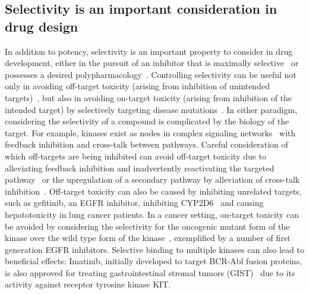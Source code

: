 \documentclass[phd,tocprelim]{cornell}
\begin{document}
\subsection{Selectivity is an important consideration in drug design}
In addition to potency, selectivity is an important property to consider in drug development, either in the pursuit of an inhibitor that is maximally selective~\citep{Zhang2009-il,Huggins2012-hr} or possesses a desired polypharmacology~\citep{Fan2007-hm,Apsel2008-it,Knight:Nat.Rev.Cancer:2010,Hopkins2006-qu,Hopkins2008-ij}.
Controlling selectivity can be useful not only in avoiding off-target toxicity (arising from inhibition of unintended targets)~\citep{Kijima2011-xs,Liu2014-yi}, but also in avoiding on-target toxicity (arising from inhibition of the intended target) by selectively targeting disease mutations~\citep{Rudmann2013-hi}. 
In either paradigm, considering the selectivity of a compound is complicated by the biology of the target. 
For example, kinases exist as nodes in complex signaling networks~\citep{Mendoza2011-bj,Tricker2015-xx} with feedback inhibition and cross-talk between pathways. 
Careful consideration of which off-targets are being inhibited can avoid off-target toxicity due to alleviating feedback inhibition and inadvertently reactivating the targeted pathway~\citep{Mendoza2011-bj,Tricker2015-xx} or the upregulation of a secondary pathway by alleviation of cross-talk inhibition~\citep{Bailey2014-pd,Chandarlapaty:CancerCell:2011}. 
Off-target toxicity can also be caused by inhibiting unrelated targets, such as gefitinib, an EGFR inhibitor, inhibiting CYP2D6~\citep{Kijima2011-xs} and causing hepatotoxicity in lung cancer patients. In a cancer setting, on-target toxicity can be avoided by considering the selectivity for the oncogenic mutant form of the kinase over the wild type form of the kinase~\citep{Pao2004-kx,Kim2012-mo,Juchum:DrugResist.Updat.:2015}, exemplified by a number of first generation EGFR inhibitors. 
Selective binding to multiple kinases can also lead to beneficial effects: Imatinib, initially developed to target BCR-Abl fusion proteins, is also approved for treating gastrointestinal stromal tumors (GIST)~\citep{Din2008-ag} due to its activity against receptor tyrosine kinase KIT. 
\end{document}
